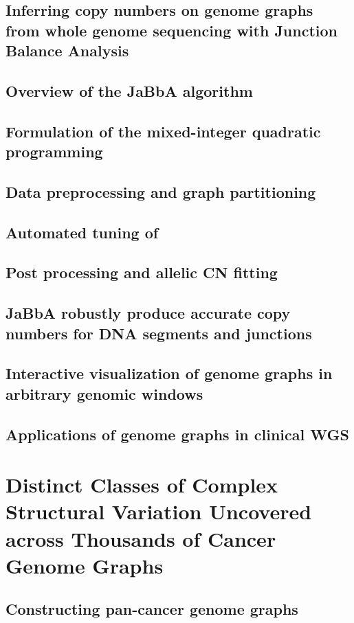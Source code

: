 \documentclass[phd,tocprelim]{cornell}
\begin{document}
\section{Inferring copy numbers on genome graphs from whole genome sequencing with Junction Balance Analysis}
\section{Overview of the JaBbA algorithm}
\section{Formulation of the mixed-integer quadratic programming}
\section{Data preprocessing and graph partitioning}
\section{Automated tuning of }
\section{Post processing and allelic CN fitting}
\section{JaBbA robustly produce accurate copy numbers for DNA segments and junctions}
\section{Interactive visualization of genome graphs in arbitrary genomic windows}
\section{Applications of genome graphs in clinical WGS}

\chapter{Distinct Classes of Complex Structural Variation Uncovered across Thousands of Cancer Genome Graphs}
\section{Constructing pan-cancer genome graphs}
\end{document}
